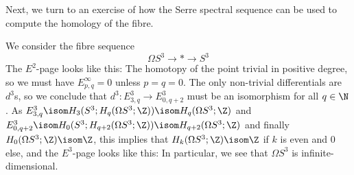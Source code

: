 Next, we turn to an exercise of how the Serre spectral sequence can be used to compute the homology of the fibre.
\begin{example}
	We consider the fibre sequence
	\begin{equation*}
		\Omega S^3 \to * \to S^3
	\end{equation*}
	The $E^2$-page looks like this:
	The homotopy of the point trivial in positive degree, so we must have $E^\infty_{p, q} = 0$ unless $p = q = 0$.
	The only non-trivial differentials are $d^3$s, so we conclude that $d^3\colon E^3_{3, q} \to E^3_{0, q + 2}$ must be an isomorphism for all $q \in \N$.
	As $E^3_{3, q} \isom H_3(S^3; H_q(\Omega S^3; \Z)) \isom H_q(\Omega S^3; \Z)$ and $E^3_{0, q + 2} \isom H_0(S^3; H_{q + 2}(\Omega S^3; \Z)) \isom H_{q + 2}(\Omega S^3; \Z)$ and finally $H_0(\Omega S^3; \Z) \isom \Z$, this implies that $H_k(\Omega S^3; \Z) \isom \Z$ if $k$ is even and 0 else, and the $E^3$-page looks like this:
	In particular, we see that $\Omega S^3$ is infinite-dimensional.
\end{example}

